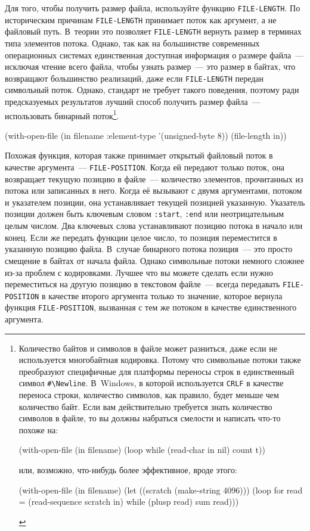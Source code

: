 Для того, чтобы получить размер файла, используйте функцию \lstinline{FILE-LENGTH}. По
историческим причинам \lstinline{FILE-LENGTH} принимает поток как аргумент, а не файловый
путь. В~теории это позволяет \lstinline{FILE-LENGTH} вернуть размер в терминах типа элементов
потока. Однако, так как на большинстве современных операционных системах единственная
доступная информация о размере файла~--- исключая чтение всего файла, чтобы узнать
размер~--- это размер в байтах, что возвращают большинство реализаций, даже если
\lstinline{FILE-LENGTH} передан символьный поток. Однако, стандарт не требует такого поведения,
поэтому ради предсказуемых результатов лучший способ получить размер файла~---
использовать бинарный поток\footnote{Количество байтов и символов в файле может
  разниться, даже если не используется многобайтная кодировка. Потому что символьные
  потоки также преобразуют специфичные для платформы переносы строк в единственный символ
  \lstinline!#\Newline!. В~Windows, в которой используется \lstinline{CRLF} в качестве переноса
  строки, количество символов, как правило, будет меньше чем количество байт. Если вам
  действительно требуется знать количество символов в файле, то вы должны набраться
  смелости и написать что-то похоже на:

\begin{myverb}
(with-open-file (in filename) 
  (loop while (read-char in nil) count t))
\end{myverb}

\noindent{}или, возможно, что-нибудь более эффективное, вроде этого:

\begin{myverb}
(with-open-file (in filename) 
  (let ((scratch (make-string 4096))) 
    (loop for read = (read-sequence scratch in) 
          while (plusp read) sum read)))
\end{myverb}
}\hspace{\footnotenegspace}.

\begin{myverb}
(with-open-file (in filename :element-type '(unsigned-byte 8)) 
  (file-length in)) 
\end{myverb}

Похожая функция, которая также принимает открытый файловый поток в качестве аргумента~---
\lstinline{FILE-POSITION}. Когда ей передают только поток, она возвращает текущую позицию в
файле~--- количество элементов, прочитанных из потока или записанных в него. Когда её
вызывают с двумя аргументами, потоком и указателем позиции, она устанавливает текущей
позицией указанную. Указатель позиции должен быть ключевым словом \lstinline{:start},
\lstinline{:end} или неотрицательным целым числом. Два ключевых слова устанавливают позицию
потока в начало или конец. Если же передать функции целое число, то позиция переместится в
указанную позицию файла. В~случае бинарного потока позиция~--- это просто смещение в байтах
от начала файла. Однако символьные потоки немного сложнее из-за проблем с
кодировками. Лучшее что вы можете сделать если нужно переместиться на другую позицию в
текстовом файле~--- всегда передавать \lstinline{FILE-POSITION} в качестве второго аргумента
только то значение, которое вернула функция \lstinline{FILE-POSITION}, вызванная с тем же
потоком в качестве единственного аргумента.

